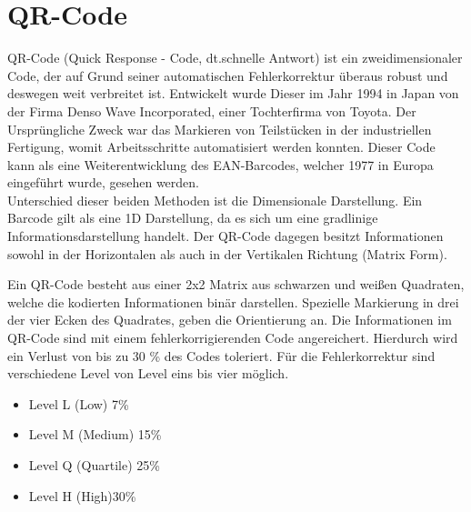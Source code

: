 \documentclass[12pt,					%
							 oneside,			%
							 a4paper,			%
							 halfparskip,		%
							 liststotoc,			%
							 bibtotoc,			%
							 fleqn,				%
							 pointlessnumbers]	%
							 {scrreprt}
\begin{document}
\section{QR-Code}
QR-Code (Quick Response - Code, dt.\glqq{}schnelle Antwort\grqq{}) ist ein zweidimensionaler Code, der auf Grund seiner automatischen Fehlerkorrektur überaus robust und deswegen weit verbreitet ist. 
Entwickelt wurde Dieser im Jahr 1994 in Japan von der Firma \glqq{}Denso Wave Incorporated\grqq{}, einer Tochterfirma von Toyota. Der Ursprüngliche Zweck war das Markieren von Teilstücken in der industriellen Fertigung, womit Arbeitsschritte automatisiert werden konnten. Dieser Code kann als eine Weiterentwicklung des EAN-Barcodes, welcher 1977 in Europa eingeführt wurde, gesehen werden.\\ Unterschied dieser beiden Methoden ist die Dimensionale Darstellung. Ein Barcode gilt als eine 1D Darstellung, da es sich um eine gradlinige Informationsdarstellung handelt. Der QR-Code dagegen besitzt Informationen sowohl in der Horizontalen als auch in der Vertikalen Richtung (Matrix Form).


Ein QR-Code besteht aus einer 2x2 Matrix aus schwarzen und weißen Quadraten, welche die kodierten Informationen binär darstellen. Spezielle Markierung in drei der vier Ecken des Quadrates, geben die Orientierung an. Die Informationen im QR-Code sind mit einem fehlerkorrigierenden Code angereichert. Hierdurch wird ein Verlust von bis zu 30 \% des Codes toleriert. Für die Fehlerkorrektur sind verschiedene Level von Level eins bis vier möglich.
\begin{itemize}
\item Level L (Low) 7\%
\item Level M (Medium) 15\%
\item Level Q (Quartile) 25\% 
\item Level H (High)30\% 
\end{itemize}
\end{document}
